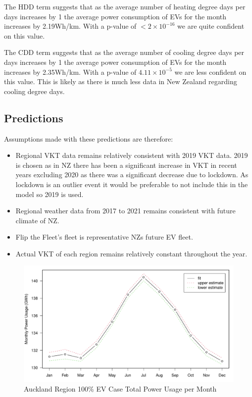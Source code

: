 \documentclass[
]{article}
\begin{document}
The HDD term suggests that as the average number of heating degree days
per days increases by 1 the average power consumption of EVs for the
month increases by 2.19Wh/km. With a p-value of \(<2\times10^{-16}\) we
are quite confident on this value.

The CDD term suggests that as the average number of cooling degree days
per days increases by 1 the average power consumption of EVs for the
month increases by 2.35Wh/km. With a p-value of \(4.11\times10^{-5}\) we
are less confident on this value. This is likely as there is much less
data in New Zealand regarding cooling degree days.

\hypertarget{predictions}{%
\subsection{Predictions}\label{predictions}}

Assumptions made with these predictions are therefore:

\begin{itemize}
\item Regional VKT data remains relatively consistent with 2019 VKT data. 2019 is chosen as in NZ there has been a significant increase in VKT in recent years excluding 2020 as there was a significant decrease due to lockdown. As lockdown is an outlier event it would be preferable to not include this in the model so 2019 is used.
\item Regional weather data from 2017 to 2021 remains consistent with future climate of NZ.
\item Flip the Fleet's fleet is representative NZs future EV fleet.
\item Actual VKT of each region remains relatively constant throughout the year.
\end{itemize}

\begin{figure}
\centering
\includegraphics{final_report_files/figure-latex/Auckland_power-1.pdf}
\caption{Auckland Region 100\% EV Case Total Power Usage per
Month\label{fig:Auckland_power}}
\end{figure}
\end{document}
